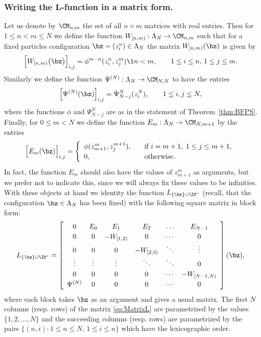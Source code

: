 \documentclass[]{pcmi}
\theoremstyle{plain}
\theoremstyle{definition}
\begin{document}
\subsubsection*{Writing the $\mathbf L$-function in a matrix form.} Let us denote by $\CM_{n, m}$ the set of all $n \times m$ matrices with real entries. Then for $1 \leq n < m \leq N$ we define the function $W_{[n,m)} : \Lambda_N \to \CM_{n, m}$ such that for a fixed particles configuration $\bz = (z_i^n) \in \Lambda_N$ the matrix $W_{[n,m)}(\bz)$ is given by
\[
 \Big[W_{[n,m)} \big(\bz\big)\Big]_{i,j} = \phi^{m - n}(z_i^n,z_j^{m}) \1{n < m},\qquad 1\leq i\leq n,\,1\le j \leq m.
\]
Similarly we define the function $\Psi^{(N)} : \Lambda_N \to \CM_{N, N}$ to have the entries
\[
\Big[\Psi^{(N)}(\bz)\Big]_{i,j} = \Psi^N_{N-j}(z_i^N),\qquad 1\leq i,j \leq N,
\]
where the functions $\phi$ and $\Psi^N_{N-j}$ are as in the statement of Theorem~\ref{thm:BFPS}. Finally, for $0 \leq m < N$ we define the function $E_m : \Lambda_N \to \CM_{N, m+1}$ by the entries
\[
\Big[E_{m}(\bz)\Big]_{i,j}=
\left\{\begin{array}{ll} 
\phi(z_{m+1}^m,z_j^{m+1}),\quad& \textrm{if}~ i=m+1,\;1\leq j \leq m+1,\\
0,&\textrm{otherwise}.
\end{array}\right.
\]
In fact, the function $E_{m}$ should also have the values of $z_{m+1}^m$ as arguments, but we prefer not to indicate this, since we will always fix these values to be infinities. With these objects at hand we identity the function $L_{\{\bz\} \cup \Zf^c}$ (recall, that the configuration $\bz \in \Lambda_N$ has been fixed) with the following square matrix in block form:
\begin{equation}\label{eq:MatrixL}
\arraycolsep=5pt\renewcommand\arraystretch{1.2}
L_{\{\bz\} \cup \Zf^c}=\left[\begin{array}{cccccc}
0 & E_0 & E_1 & E_2 &\ldots & E_{N-1} \\
0 & 0 & -W_{[1,2)} & 0 & \cdots & 0 \\
0 & 0 & 0 & -W_{[2,3)} & \ddots & \vdots \\
\vdots & \vdots & \vdots & \ddots & \ddots &0    \\
0 & 0 & 0 & 0 &\cdots & -W_{[N-1,N)} \\
\Psi^{(N)} & 0 & 0 & 0 & \cdots & 0
\end{array}
\right] (\bz),
\end{equation}
where each block takes $\bz$ as an argument and gives a usual matrix. The first $N$ columns (resp. rows) of the matrix \eqref{eq:MatrixL} are parametrized by the values $\{1,2,\ldots,N\}$ and the succeeding columns (resp. rows) are parametrized by the pairs $\{(n, i) : 1 \leq n \leq N,\, 1 \leq i \leq n\}$ which have the lexicographic order.
\end{document}
